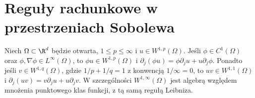 \section{Reguły rachunkowe w przestrzeniach Sobolewa}
\label{sec:pde9-calculus}

\begin{twierdzenie}
\label{thm:pde9-products}
Niech $\Omega\subset\R^d$ będzie otwarta, $1\le p\le\infty$
i $u\in W^{1,p}(\Omega)$.
Jeśli $\phi\in C^1(\Omega)$ oraz $\phi,\nabla\phi\in L^\infty(\Omega)$,
to $\phi u\in W^{1,p}(\Omega)$ i
$\partial_j(\phi u)=\phi\partial_j u+u\partial_j\phi$.
Ponadto jeśli $v\in W^{1,q}(\Omega)$, gdzie
$1/p+1/q=1$ z konwencją $1/\infty=0$,
to $uv\in W^{1,1}(\Omega)$ i
$\partial_j(uv)=v\partial_j u+u\partial_j v$.
W szczególności $W^{1,\infty}(\Omega)$ jest algebrą
względem mnożenia punktowego klas funkcji, z tą samą
regułą Leibniza.
\end{twierdzenie}
